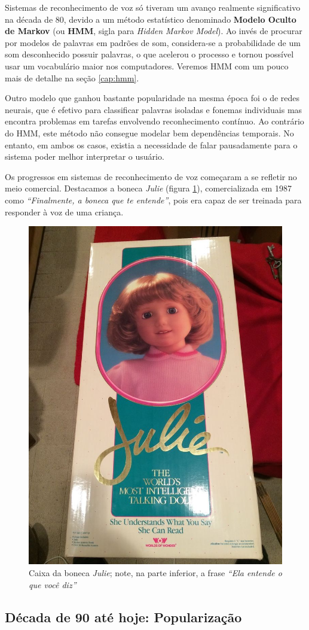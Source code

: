 Sistemas de reconhecimento de voz só tiveram um avanço realmente significativo na década de 80, devido a um método estatístico denominado \textbf{Modelo Oculto de Markov} (ou \textbf{HMM}, sigla para \textit{Hidden Markov Model}). Ao invés de procurar por modelos de palavras em padrões de som, considera-se a probabilidade de um som desconhecido possuir palavras, o que acelerou o processo e tornou possível usar um vocabulário maior nos computadores. Veremos HMM com um pouco mais de detalhe na seção \ref{cap:hmm}.

Outro modelo que ganhou bastante popularidade na mesma época foi o de redes neurais, que é efetivo para classificar palavras isoladas e fonemas individuais mas encontra problemas em tarefas envolvendo reconhecimento contínuo. Ao contrário do HMM, este método não consegue modelar bem dependências temporais. No entanto, em ambos os casos, existia a necessidade de falar pausadamente para o sistema poder melhor interpretar o usuário.

Os progressos em sistemas de reconhecimento de voz começaram a se refletir no meio comercial. Destacamos a boneca \textit{Julie} (figura \ref{julie}), comercializada em 1987 como \textit{``Finalmente, a boneca que te entende''}, pois era capaz de ser treinada para responder à voz de uma criança.

\begin{figure}[H]
  \centering
  \includegraphics[width=.35\textwidth]{image/julie.jpg}
  \caption{Caixa da boneca \textit{Julie}; note, na parte inferior, a frase \textit{``Ela entende o que você diz''} \citep{julieImage}}
  \label{julie}
\end{figure}


\subsection{Década de 90 até hoje: Popularização}

